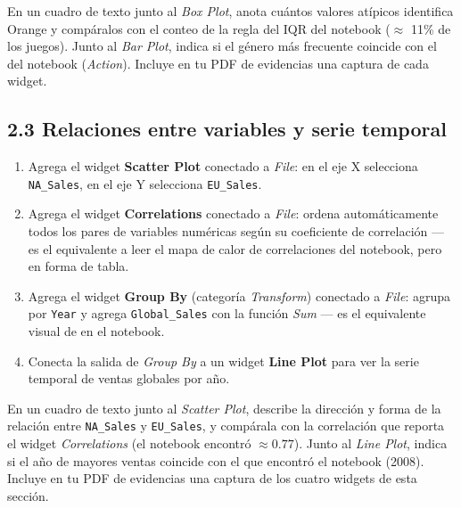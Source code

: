 \documentclass[11pt,letterpaper]{article}
\begin{document}
\begin{actividad}
En un cuadro de texto junto al \textit{Box Plot}, anota cuántos valores atípicos identifica Orange y compáralos con el conteo de la regla del IQR del notebook ($\approx$ 11\% de los juegos). Junto al \textit{Bar Plot}, indica si el género más frecuente coincide con el del notebook (\textit{Action}). Incluye en tu PDF de evidencias una captura de cada widget.
\end{actividad}

\subsection{2.3 Relaciones entre variables y serie temporal}

\begin{enumerate}[leftmargin=1.2cm]
  \item Agrega el widget \textbf{Scatter Plot} conectado a \textit{File}: en el eje X selecciona \texttt{NA\_Sales}, en el eje Y selecciona \texttt{EU\_Sales}.
  \item Agrega el widget \textbf{Correlations} conectado a \textit{File}: ordena automáticamente todos los pares de variables numéricas según su coeficiente de correlación --- es el equivalente a leer el mapa de calor de correlaciones del notebook, pero en forma de tabla.
  \item Agrega el widget \textbf{Group By} (categoría \textit{Transform}) conectado a \textit{File}: agrupa por \texttt{Year} y agrega \texttt{Global\_Sales} con la función \textit{Sum} --- es el equivalente visual de \texttt{} en el notebook.
  \item Conecta la salida de \textit{Group By} a un widget \textbf{Line Plot} para ver la serie temporal de ventas globales por año.
\end{enumerate}

\begin{actividad}
En un cuadro de texto junto al \textit{Scatter Plot}, describe la dirección y forma de la relación entre \texttt{NA\_Sales} y \texttt{EU\_Sales}, y compárala con la correlación que reporta el widget \textit{Correlations} (el notebook encontró $\approx 0.77$). Junto al \textit{Line Plot}, indica si el año de mayores ventas coincide con el que encontró el notebook (2008). Incluye en tu PDF de evidencias una captura de los cuatro widgets de esta sección.
\end{actividad}

\end{document}
